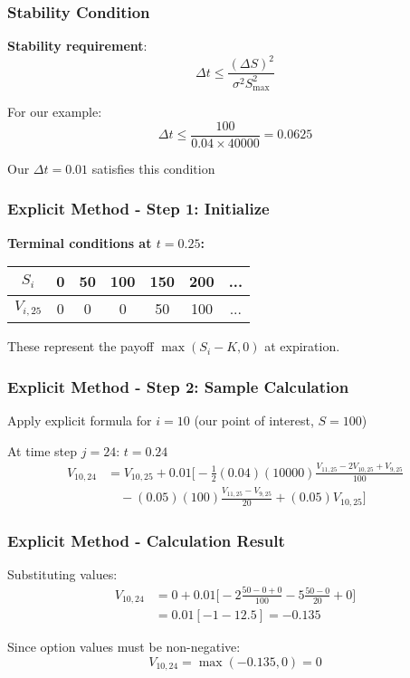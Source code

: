 \documentclass[aspectratio=169]{beamer}
\begin{document}
\begin{frame}
\frametitle{Stability Condition}
\textbf{Stability requirement}: 
\[\Delta t \leq \frac{(\Delta S)^2}{\sigma^2 S_{\max}^2}\]

For our example:
\[\Delta t \leq \frac{100}{0.04 \times 40000} = 0.0625\]

Our \(\Delta t = 0.01\) satisfies this condition \checkmark
\end{frame}

\begin{frame}
\frametitle{Explicit Method - Step 1: Initialize}
\textbf{Terminal conditions at \(t = 0.25\):}

\begin{center}
\begin{tabular}{c|c|c|c|c|c|c}
\(S_i\) & 0 & 50 & 100 & 150 & 200 & ... \\
\hline
\(V_{i,25}\) & 0 & 0 & 0 & 50 & 100 & ...
\end{tabular}
\end{center}

These represent the payoff \(\max(S_i - K, 0)\) at expiration.
\end{frame}

\begin{frame}
\frametitle{Explicit Method - Step 2: Sample Calculation}
Apply explicit formula for \(i = 10\) (our point of interest, \(S = 100\))

At time step \(j = 24\): \(t = 0.24\)
\begin{align}
V_{10,24} &= V_{10,25} + 0.01 \bigg[ -\frac{1}{2}(0.04)(10000) \frac{V_{11,25} - 2V_{10,25} + V_{9,25}}{100} \\
&\quad - (0.05)(100) \frac{V_{11,25} - V_{9,25}}{20} + (0.05)V_{10,25} \bigg]
\end{align}
\end{frame}

\begin{frame}
\frametitle{Explicit Method - Calculation Result}
Substituting values:
\begin{align}
V_{10,24} &= 0 + 0.01 \bigg[ -2 \frac{50 - 0 + 0}{100} - 5 \frac{50 - 0}{20} + 0 \bigg] \\
&= 0.01[-1 - 12.5] = -0.135
\end{align}

Since option values must be non-negative: 
\[V_{10,24} = \max(-0.135, 0) = 0\]
\end{frame}
\end{document}

